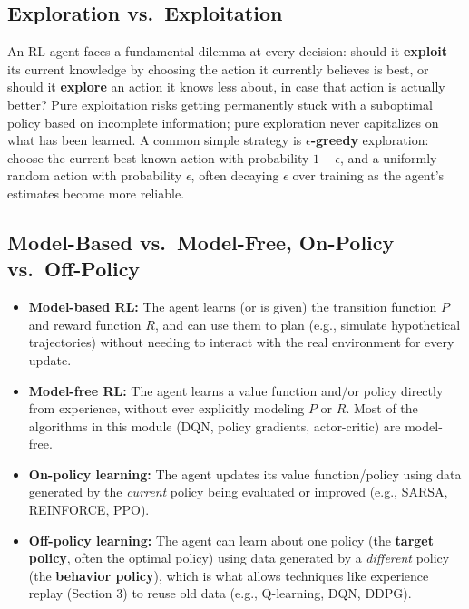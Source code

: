 \documentclass[12pt,a4paper]{article}
\begin{document}
\subsection{Exploration vs.\ Exploitation}

\begin{keyidea}
An RL agent faces a fundamental dilemma at every decision: should it \textbf{exploit} its current knowledge by choosing the action it currently believes is best, or should it \textbf{explore} an action it knows less about, in case that action is actually better? Pure exploitation risks getting permanently stuck with a suboptimal policy based on incomplete information; pure exploration never capitalizes on what has been learned. A common simple strategy is \textbf{$\epsilon$-greedy} exploration: choose the current best-known action with probability $1-\epsilon$, and a uniformly random action with probability $\epsilon$, often decaying $\epsilon$ over training as the agent's estimates become more reliable.
\end{keyidea}

\subsection{Model-Based vs.\ Model-Free, On-Policy vs.\ Off-Policy}

\begin{itemize}[leftmargin=1.5em]
    \item \textbf{Model-based RL:} The agent learns (or is given) the transition function $P$ and reward function $R$, and can use them to plan (e.g., simulate hypothetical trajectories) without needing to interact with the real environment for every update.
    \item \textbf{Model-free RL:} The agent learns a value function and/or policy directly from experience, without ever explicitly modeling $P$ or $R$. Most of the algorithms in this module (DQN, policy gradients, actor-critic) are model-free.
    \item \textbf{On-policy learning:} The agent updates its value function/policy using data generated by the \emph{current} policy being evaluated or improved (e.g., SARSA, REINFORCE, PPO).
    \item \textbf{Off-policy learning:} The agent can learn about one policy (the \textbf{target policy}, often the optimal policy) using data generated by a \emph{different} policy (the \textbf{behavior policy}), which is what allows techniques like experience replay (Section 3) to reuse old data (e.g., Q-learning, DQN, DDPG).
\end{itemize}
\end{document}
